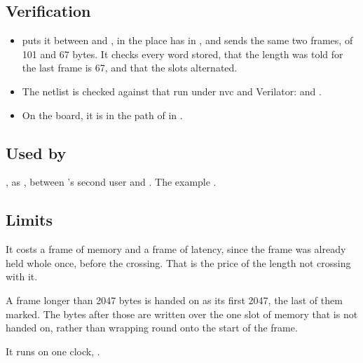 \subsection*{Verification}

\begin{itemize}
\item {} puts it between  and
, in the place  has in ,
and sends the same two frames, of 101 and 67 bytes. It checks every
word stored, that the length  was told for the last frame
is 67, and that the slots alternated.
\item The netlist is checked against that run under nvc and
Verilator:  and
.
\item On the board, it is in the path of
in .
\end{itemize}

\subsection*{Used by}

, as , between 's second user
and . The example .

\subsection*{Limits}

It costs a frame of memory and a frame of latency, since the frame was
already held whole once, before the crossing. That is the price of the
length not crossing with it.

A frame longer than 2047 bytes is handed on as its first 2047, the
last of them marked. The bytes after those are written over the one
slot of memory that is not handed on, rather than wrapping round onto
the start of the frame.

It runs on one clock, .
